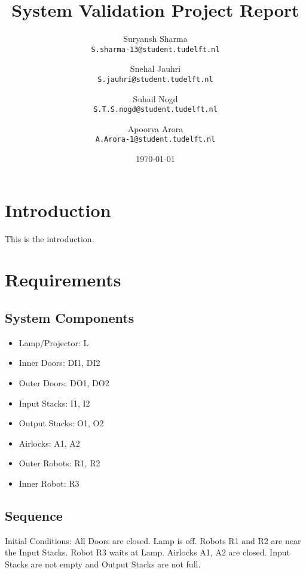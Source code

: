 \documentclass[a4paper,12pt]{article}
\begin{document}
\title{System Validation Project Report}
\author{
	Suryansh Sharma \\ 
	\texttt{S.sharma-13@student.tudelft.nl}
 	\and 
	Snehal Jauhri \\
	\texttt{S.jauhri@student.tudelft.nl} 
	\and
	Suhail Nogd \\
	\texttt{S.T.S.nogd@student.tudelft.nl} 	
	 \and 
	Apoorva Arora\\
	\texttt{A.Arora-1@student.tudelft.nl} 
}

\date {\today}
\maketitle

\section{Introduction}
This is the introduction.

\section{Requirements}

\subsection{System Components}
\begin{itemize}
\item Lamp/Projector: L
\item Inner Doors: DI1, DI2
\item Outer Doors: DO1, DO2
\item Input Stacks: I1, I2
\item Output Stacks: O1, O2
\item Airlocks: A1, A2
\item Outer Robots: R1, R2
\item Inner Robot: R3
\end{itemize}

\subsection{Sequence}
Initial Conditions: All Doors are closed. Lamp is off. Robots R1 and R2 are near the Input Stacks. Robot R3 waits at Lamp. Airlocks A1, A2 are closed. Input Stacks are not empty and Output Stacks are not full.
\end{document}
